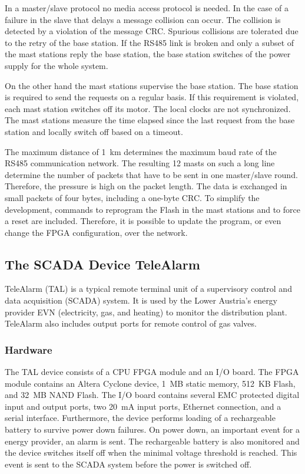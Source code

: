 In a master/slave protocol no media access protocol is needed. In the
case of a failure in the slave that delays a message collision can
occur. The collision is detected by a violation of the message CRC.
Spurious collisions are tolerated due to the retry of the base
station. If the RS485 link is broken and only a subset of the mast
stations reply the base station, the base station switches of the
power supply for the whole system.

On the other hand the mast stations supervise the base station. The
base station is required to send the requests on a regular basis. If
this requirement is violated, each mast station switches off its
motor. The local clocks are not synchronized. The mast stations
measure the time elapsed since the last request from the base station
and locally switch off based on a timeout.

The maximum distance of 1~km determines the maximum baud rate of the
RS485 communication network. The resulting 12 masts on such a long
line determine the number of packets that have to be sent in one
master/slave round. Therefore, the pressure is high on the packet
length. The data is exchanged in small packets of four bytes,
including a one-byte CRC. To simplify the development, commands to
reprogram the Flash in the mast stations and to force a reset are
included. Therefore, it is possible to update the program, or even
change the FPGA configuration, over the network.

\subsection{The SCADA Device TeleAlarm}

TeleAlarm (TAL) is a typical remote terminal unit of a supervisory
control and data acquisition (SCADA) system. It is used by the Lower
Austria's energy provider EVN (electricity, gas, and heating) to
monitor the distribution plant. TeleAlarm also includes output ports
for remote control of gas valves.

\subsubsection{Hardware}

The TAL device consists of a CPU FPGA module and an I/O board. The
FPGA module contains an Altera Cyclone device, 1~MB static memory,
512~KB Flash, and 32~MB NAND Flash. The I/O board contains several
EMC protected digital input and output ports, two 20~mA input ports,
Ethernet connection, and a serial interface. Furthermore, the device
performs loading of a rechargeable battery to survive power down
failures. On power down, an important event for a energy provider, an
alarm is sent. The rechargeable battery is also monitored and the
device switches itself off when the minimal voltage threshold is
reached. This event is sent to the SCADA system before the power is
switched off.

